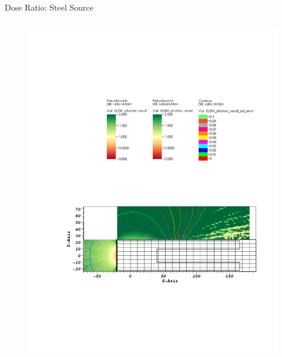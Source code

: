 \documentclass{beamer}
\begin{document}
\begin{frame}{Dose Ratio: Steel Source}
\begin{columns}[T]
\begin{figure}
                \includegraphics[scale=0.49,trim={20cm 16.5cm 7cm 6cm},clip]{figs/ratio_steel_novoid.pdf}
        \end{figure}

\end{columns}
\end{frame}
\end{document}
